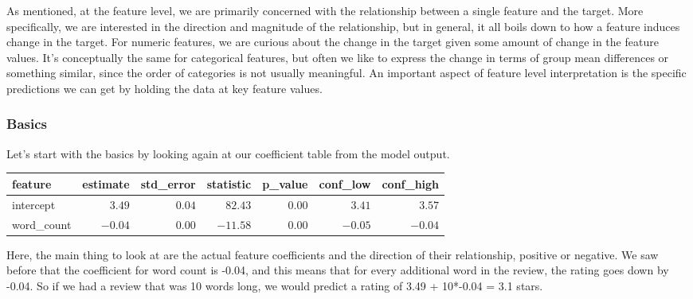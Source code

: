 \documentclass[
  letterpaper,
]{krantz}
\begin{document}
As mentioned, at the feature level, we are primarily concerned with the
relationship between a single feature and the target. More specifically,
we are interested in the direction and magnitude of the relationship,
but in general, it all boils down to how a feature induces change in the
target. For numeric features, we are curious about the change in the
target given some amount of change in the feature values. It's
conceptually the same for categorical features, but often we like to
express the change in terms of group mean differences or something
similar, since the order of categories is not usually meaningful. An
important aspect of feature level interpretation is the specific
predictions we can get by holding the data at key feature values.

\subsubsection{Basics}\label{basics}

Let's start with the basics by looking again at our coefficient table
from the model output.

\small

\begin{longtable*}{lrrrrrr}
\toprule
feature & estimate & std\_error & statistic & p\_value & conf\_low & conf\_high \\ 
\midrule\addlinespace[2.5pt]
intercept & \textcolor[HTML]{404040}{$3.49$} & \textcolor[HTML]{404040}{$0.04$} & \textcolor[HTML]{404040}{$82.43$} & \textcolor[HTML]{404040}{$0.00$} & \textcolor[HTML]{404040}{$3.41$} & \textcolor[HTML]{404040}{$3.57$} \\ 
word\_count & \textcolor[HTML]{404040}{$-0.04$} & \textcolor[HTML]{404040}{$0.00$} & \textcolor[HTML]{404040}{$-11.58$} & \textcolor[HTML]{404040}{$0.00$} & \textcolor[HTML]{404040}{$-0.05$} & \textcolor[HTML]{404040}{$-0.04$} \\ 
\bottomrule
\end{longtable*}

\normalsize

Here, the main thing to look at are the actual feature coefficients and
the direction of their relationship, positive or negative. We saw before
that the coefficient for word count is -0.04, and this means that for
every additional word in the review, the rating goes down by -0.04. So
if we had a review that was 10 words long, we would predict a rating of
3.49 + 10*-0.04 = 3.1 stars.
\end{document}
